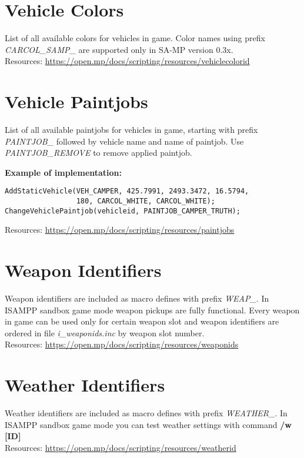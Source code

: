 \documentclass{article}
\begin{document}
\section{Vehicle Colors}
List of all available colors for vehicles in game. Color names using prefix \textit{CARCOL\_SAMP\_} are supported only in SA-MP version 0.3x.
\bigskip
\\Resources: \url{https://open.mp/docs/scripting/resources/vehiclecolorid}


\section{Vehicle Paintjobs}
\begin{sloppypar}
List of all available paintjobs for vehicles in game, starting with prefix \textit{PAINTJOB\_} followed by vehicle name and name of paintjob. Use \textit{PAINTJOB\_REMOVE} to remove applied paintjob.
\end{sloppypar}
\bigskip
\noindent \textbf{Example of implementation:}
\begin{verbatim}
AddStaticVehicle(VEH_CAMPER, 425.7991, 2493.3472, 16.5794,
                 180, CARCOL_WHITE, CARCOL_WHITE);
ChangeVehiclePaintjob(vehicleid, PAINTJOB_CAMPER_TRUTH);
\end{verbatim}
\bigskip
Resources: \url{https://open.mp/docs/scripting/resources/paintjobs}


\section{Weapon Identifiers}
Weapon identifiers are included as macro defines with prefix \textit{WEAP\_}. In ISAMPP sandbox game mode weapon pickups are fully functional. Every weapon in game can be used only for certain weapon slot and weapon identifiers are ordered in file \textit{i\_weaponids.inc} by weapon slot number.
\bigskip
\\Resources: \url{https://open.mp/docs/scripting/resources/weaponids}


\section{Weather Identifiers}
Weather identifiers are included as macro defines with prefix \textit{WEATHER\_}. In ISAMPP sandbox game mode you can test weather settings with command \textbf{/w [ID]}
\bigskip
\\Resources: \url{https://open.mp/docs/scripting/resources/weatherid}
\end{document}
